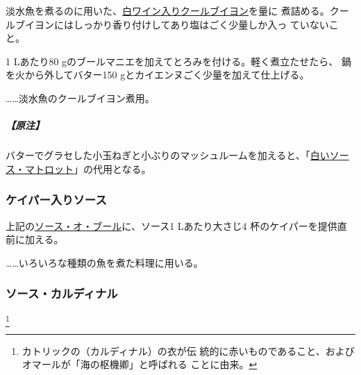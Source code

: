 \begin{recette}
淡水魚を煮るのに用いた、\protect\hyperlink{court-bouillon-b}{白ワイン入りクールブイヨン}を\untiers{}量に
煮詰める。クールブイヨンにはしっかり香り付けしてあり塩はごく少量しか入っ
ていないこと。

1 Lあたり80 gのブールマニエを加えてとろみを付ける。軽く煮立たせたら、
鍋を火から外してバター150 gとカイエンヌごく少量を加えて仕上げる。

\ldots{}\ldots{}淡水魚のクールブイヨン煮用。

\hypertarget{ux539fux6ce8-1}{%
\subparagraph{【原注】}\label{ux539fux6ce8-1}}

バターでグラセした小玉ねぎと小ぶりのマッシュルームを加えると、「\protect\hyperlink{sauce-matelote-blanche}{白いソー
ス・マトロット}」の代用となる。

\maeaki

\hypertarget{sauce-aux-capres}{%
\subsubsection{ケイパー入りソース}\label{sauce-aux-capres}}



上記の\protect\hyperlink{sauce-au-beurre}{ソース・オ・ブール}に、ソース1
Lあたり大さじ4 杯のケイパーを提供直前に加える。

\ldots{}\ldots{}いろいろな種類の魚を煮た料理に用いる。

\maeaki

\hypertarget{sauce-cardinal}{%
\subsubsection{ソース・カルディナル}\label{sauce-cardinal}}

\footnote{カトリックの（カルディナル）の衣が伝
  統的に赤いものであること、およびオマールが「海の枢機卿」と呼ばれる
  ことに由来。}



\end{recette}
